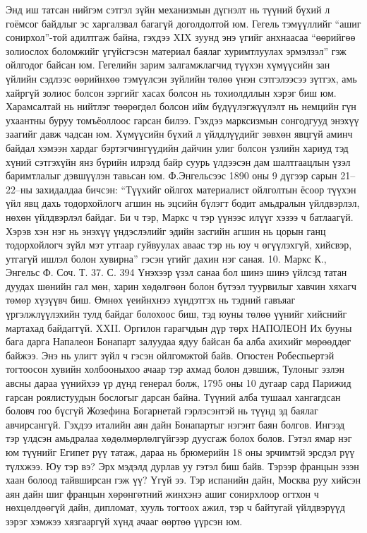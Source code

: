 Энд иш татсан нийгэм сэтгэл зүйн механизмын дүгнэлт нь түүний бүхий л гоёмсог байдлыг эс харгалзвал багагүй доголдолтой юм. Гегель тэмүүллийг “ашиг сонирхол”-той адилтгаж байна, гэхдээ XIX зуунд энэ үгийг анхнаасаа “өөрийгөө золиослох боломжийг үгүйсгэсэн материал баялаг хуримтлуулах эрмэлзэл” гэж ойлгодог байсан юм. Гегелийн зарим залгамжлагчид түүхэн хүмүүсийн зан үйлийн сэдлээс өөрийнхөө тэмүүлсэн зүйлийн төлөө үнэн сэтгэлээсээ зүтгэх, амь хайргүй золиос болсон зэргийг хасах болсон нь тохиолдллын хэрэг биш юм. Харамсалтай нь нийтлэг төөрөгдөл болсон ийм бүдүүлэгжүүлэлт нь немцийн гүн ухаантны буруу томъёоллоос гарсан билээ.
Гэхдээ марксизмын сонгодгууд энэхүү заагийг давж чадсан юм. Хүмүүсийн бүхий л үйлдлүүдийг зөвхөн явцгүй аминч байдал хэмээн хардаг бэртэгчингүүдийн дайчин улиг болсон үзлийн хариуд тэд хүний сэтгэхүйн янз бүрийн илрэлд байр суурь үлдээсэн дам шалтгаацлын үзэл баримтлалыг дэвшүүлэн тавьсан юм.
Ф.Энгельсээс 1890 оны 9 дүгээр сарын 21–22–ны захидалдаа бичсэн: “Түүхийг ойлгох материалист ойлголтын ёсоор түүхэн үйл явц дахь тодорхойлогч агшин нь эцсийн бүлэгт бодит амьдралын үйлдвэрлэл, нөхөн үйлдвэрлэл байдаг. Би ч тэр, Маркс ч тэр үүнээс илүүг хэзээ ч батлаагүй. Хэрэв хэн нэг нь энэхүү үндэслэлийг эдийн засгийн агшин нь цорын ганц тодорхойлогч зүйл мэт утгаар гуйвуулах аваас тэр нь юу ч өгүүлэхгүй, хийсвэр, утгагүй ишлэл болон хувирна” гэсэн үгийг дахин нэг саная. 10. Маркс К., Энгельс Ф. Соч. Т. 37. С. 394
Үнэхээр үзэл санаа бол шинэ шинэ үйлсэд татан дуудах шөнийн гал мөн, харин хөдөлгөөн болон бүтээл туурвилыг хавчин хяхагч төмөр хүзүүвч биш. Өмнөх үеийнхнээ хүндэтгэх нь тэдний гавъяаг үргэлжлүүлэхийн тулд байдаг болохоос биш, тэд юуны төлөө үүнийг хийснийг мартахад байдаггүй.
XXII. Оргилон гарагчдын дүр төрх
НАПОЛЕОН
Их бууны бага дарга Напалеон Бонапарт залуудаа ядуу байсан ба алба ахихийг мөрөөддөг байжээ. Энэ нь улигт зүйл ч гэсэн ойлгомжтой байв. Огюстен Робеспьертэй тогтоосон хувийн холбооныхоо ачаар тэр ахмад болон дэвшиж, Тулоныг эзлэн авсны дараа үүнийхээ үр дүнд генерал болж, 1795 оны 10 дугаар сард Парижид гарсан роялистуудын бослогыг дарсан байна. Түүний алба тушаал хангагдсан боловч гоо бүсгүй Жозефина Богарнетай гэрлэсэнтэй нь түүнд эд баялаг авчирсангүй. Гэхдээ италийн аян дайн Бонапартыг нэгэнт баян болгов. Ингээд тэр үлдсэн амьдралаа хөдөлмөрлөлгүйгээр дуусгаж болох болов. Гэтэл ямар нэг юм түүнийг Египет рүү татаж, дараа нь брюмерийн 18 оны эрчимтэй эрсдэл рүү түлхжээ. Юу тэр вэ? Эрх мэдэлд дурлав уу гэтэл биш байв. Тэрээр францын эзэн хаан болоод тайвширсан гэж үү? Үгүй ээ. Тэр испанийн дайн, Москва руу хийсэн аян дайн шиг францын хөрөнгөтний жинхэнэ ашиг сонирхлоор огтхон ч нөхцөлдөөгүй дайн, дипломат, хууль тогтоох ажил, тэр ч байтугай үйлдвэрүүд зэрэг хэмжээ хязгааргүй хүнд ачааг өөртөө үүрсэн юм.
